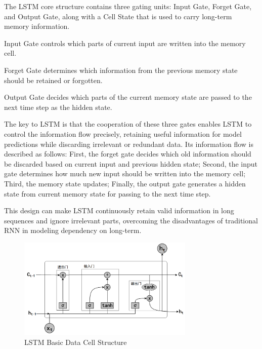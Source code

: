 The LSTM core structure contains three gating units: Input Gate, Forget Gate, and Output Gate, along with a Cell State that is used to carry long-term memory information.

Input Gate controls which parts of current input are written into the memory cell.

Forget Gate determines which information from the previous memory state should be retained or forgotten.

Output Gate decides which parts of the current memory state are passed to the next time step as the hidden state.

The key to LSTM is that the cooperation of these three gates enables LSTM to control the information flow precisely, retaining useful information for model predictions while discarding irrelevant or redundant data. Its information flow is described as follows: First, the forget gate decides which old information should be discarded based on current input and previous hidden state; Second, the input gate determines how much new input should be written into the memory cell; Third, the memory state updates; Finally, the output gate generates a hidden state from current memory state for passing to the next time step.

This design can make LSTM continuously retain valid information in long sequences and ignore irrelevant parts, overcoming the disadvantages of traditional RNN in modeling dependency on long-term.


\begin{figure}[hbt]
	\centering
	\includegraphics[width=0.75\textwidth]{figures/2.5}
	\caption{LSTM Basic Data Cell Structure}\label{fig:2.5}
\end{figure}

